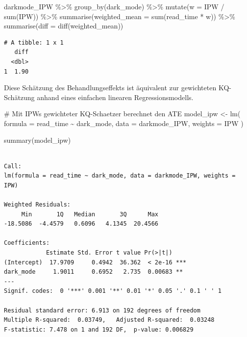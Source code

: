 \documentclass[
  a4paper,
  DIV=11,
  oneside]{scrreprt}
\newenvironment{Shaded}{\begin{snugshade}}{\end{snugshade}}
\newcommand{\AttributeTok}[1]{\textcolor[rgb]{0.40,0.45,0.13}{#1}}
\newcommand{\CommentTok}[1]{\textcolor[rgb]{0.37,0.37,0.37}{#1}}
\newcommand{\FunctionTok}[1]{\textcolor[rgb]{0.28,0.35,0.67}{#1}}
\newcommand{\NormalTok}[1]{\textcolor[rgb]{0.00,0.23,0.31}{#1}}
\newcommand{\OtherTok}[1]{\textcolor[rgb]{0.00,0.23,0.31}{#1}}
\newcommand{\SpecialCharTok}[1]{\textcolor[rgb]{0.37,0.37,0.37}{#1}}
\begin{document}
\begin{Shaded}
\begin{Highlighting}[]
\NormalTok{darkmode\_IPW }\SpecialCharTok{\%\textgreater{}\%}
  \FunctionTok{group\_by}\NormalTok{(dark\_mode) }\SpecialCharTok{\%\textgreater{}\%}
  \FunctionTok{mutate}\NormalTok{(}\AttributeTok{w =}\NormalTok{ IPW }\SpecialCharTok{/} \FunctionTok{sum}\NormalTok{(IPW)) }\SpecialCharTok{\%\textgreater{}\%}
  \FunctionTok{summarise}\NormalTok{(}\AttributeTok{weighted\_mean =} \FunctionTok{sum}\NormalTok{(read\_time }\SpecialCharTok{*}\NormalTok{ w)) }\SpecialCharTok{\%\textgreater{}\%}
  \FunctionTok{summarise}\NormalTok{(}\AttributeTok{diff =} \FunctionTok{diff}\NormalTok{(weighted\_mean))}
\end{Highlighting}
\end{Shaded}

\begin{verbatim}
# A tibble: 1 x 1
   diff
  <dbl>
1  1.90
\end{verbatim}

Diese Schätzung des Behandlungseffekts ist äquivalent zur gewichteten
KQ-Schätzung anhand eines einfachen linearen Regressionsmodells.

\begin{Shaded}
\begin{Highlighting}[]
\CommentTok{\# Mit IPWs gewichteter KQ{-}Schaetzer berechnet den ATE}
\NormalTok{model\_ipw }\OtherTok{\textless{}{-}} \FunctionTok{lm}\NormalTok{(}
  \AttributeTok{formula =}\NormalTok{ read\_time }\SpecialCharTok{\textasciitilde{}}\NormalTok{ dark\_mode, }
  \AttributeTok{data =}\NormalTok{ darkmode\_IPW,}
  \AttributeTok{weights =}\NormalTok{ IPW}
\NormalTok{)}

\FunctionTok{summary}\NormalTok{(model\_ipw)}
\end{Highlighting}
\end{Shaded}

\begin{verbatim}

Call:
lm(formula = read_time ~ dark_mode, data = darkmode_IPW, weights = IPW)

Weighted Residuals:
     Min       1Q   Median       3Q      Max 
-18.5086  -4.4579   0.6096   4.1345  20.4566 

Coefficients:
            Estimate Std. Error t value Pr(>|t|)    
(Intercept)  17.9709     0.4942  36.362  < 2e-16 ***
dark_mode     1.9011     0.6952   2.735  0.00683 ** 
---
Signif. codes:  0 '***' 0.001 '**' 0.01 '*' 0.05 '.' 0.1 ' ' 1

Residual standard error: 6.913 on 192 degrees of freedom
Multiple R-squared:  0.03749,   Adjusted R-squared:  0.03248 
F-statistic: 7.478 on 1 and 192 DF,  p-value: 0.006829
\end{verbatim}
\end{document}
